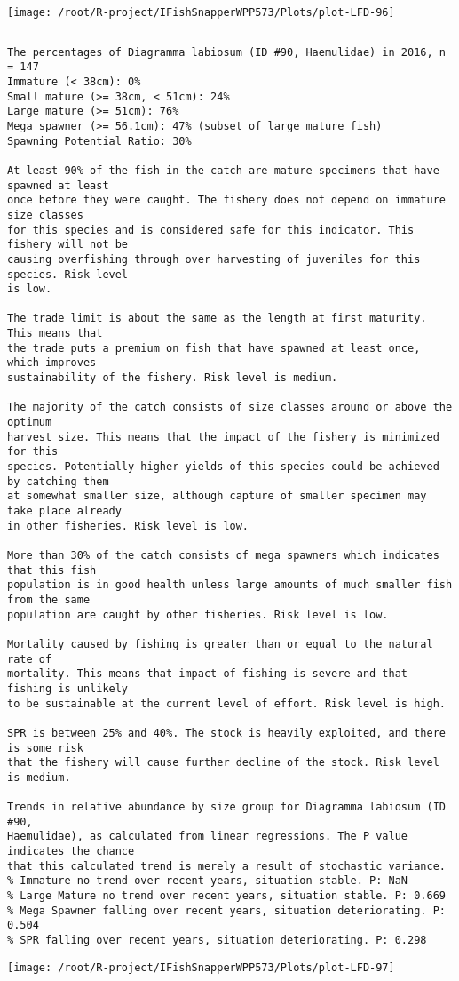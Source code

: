 \documentclass{report}\usepackage[]{graphicx}\usepackage[]{color}
\makeatletter
\def\maxwidth{ %
  \ifdim\Gin@nat@width>\linewidth
    \linewidth
  \else
    \Gin@nat@width
  \fi
}
\newenvironment{kframe}{%
 \def\at@end@of@kframe{}%
 \ifinner\ifhmode%
  \def\at@end@of@kframe{\end{minipage}}%
  \begin{minipage}{\columnwidth}%
 \fi\fi%
 \def\FrameCommand##1{\hskip\@totalleftmargin \hskip-\fboxsep
 \colorbox{shadecolor}{##1}\hskip-\fboxsep
     \hskip-\linewidth \hskip-\@totalleftmargin \hskip\columnwidth}%
 \MakeFramed {\advance\hsize-\width
   \@totalleftmargin\z@ \linewidth\hsize
   \@setminipage}}%
 {\par\unskip\endMakeFramed%
 \at@end@of@kframe}
\newenvironment{knitrout}{}{} %
\makeatother
\begin{document}
\begin{knitrout}
\texttt{[image: /root/R-project/IFishSnapperWPP573/Plots/plot-LFD-96]} 
\begin{kframe}\begin{verbatim}
\end{verbatim}
\end{kframe}
\clearpage
\newpage
\begin{kframe}\begin{verbatim}The percentages of Diagramma labiosum (ID #90, Haemulidae) in 2016, n = 147
Immature (< 38cm): 0%
Small mature (>= 38cm, < 51cm): 24%
Large mature (>= 51cm): 76%
Mega spawner (>= 56.1cm): 47% (subset of large mature fish)
Spawning Potential Ratio: 30%
 
At least 90% of the fish in the catch are mature specimens that have spawned at least
once before they were caught. The fishery does not depend on immature size classes
for this species and is considered safe for this indicator. This fishery will not be
causing overfishing through over harvesting of juveniles for this species. Risk level
is low.

The trade limit is about the same as the length at first maturity.  This means that
the trade puts a premium on fish that have spawned at least once, which improves
sustainability of the fishery. Risk level is medium.

The majority of the catch consists of size classes around or above the optimum
harvest size. This means that the impact of the fishery is minimized for this
species. Potentially higher yields of this species could be achieved by catching them
at somewhat smaller size, although capture of smaller specimen may take place already
in other fisheries. Risk level is low.

More than 30% of the catch consists of mega spawners which indicates that this fish
population is in good health unless large amounts of much smaller fish from the same
population are caught by other fisheries. Risk level is low.
 
Mortality caused by fishing is greater than or equal to the natural rate of
mortality. This means that impact of fishing is severe and that fishing is unlikely
to be sustainable at the current level of effort. Risk level is high.
 
SPR is between 25% and 40%. The stock is heavily exploited, and there is some risk
that the fishery will cause further decline of the stock. Risk level is medium.
 
Trends in relative abundance by size group for Diagramma labiosum (ID #90,
Haemulidae), as calculated from linear regressions. The P value indicates the chance
that this calculated trend is merely a result of stochastic variance.
% Immature no trend over recent years, situation stable. P: NaN
% Large Mature no trend over recent years, situation stable. P: 0.669
% Mega Spawner falling over recent years, situation deteriorating. P: 0.504
% SPR falling over recent years, situation deteriorating. P: 0.298
\end{verbatim}
\end{kframe}
\texttt{[image: /root/R-project/IFishSnapperWPP573/Plots/plot-LFD-97]} 


\end{knitrout}
\end{document}
